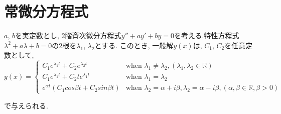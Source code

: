 \section{常微分方程式} %
\label{sec:常微分方程式}
\begin{theo}
    $a$, $b$を実定数とし, 2階斉次微分方程式$y''+ay'+by=0$を考える.特性方程式$\lambda^2+a\lambda+b=0$の2根を$\lambda_{1}$, $\lambda_{2}$とする. このとき, 一般解$y(x)$は, $C_{1}$, $C_{2}$を任意定数として, 
    \begin{equation}
        y(x)= \begin{cases}
                C_{1}e^{\lambda_{1} t}+C_{2}e^{\lambda_{2} t} &\text{when }\lambda_{1}\neq\lambda_{2}, (\lambda_{1}, \lambda_{2}\in\mathbb{R}) \\
                C_{1}e^{\lambda_{1} t}+C_{2}te^{\lambda_{1} t} &\text{when }\lambda_{1}=\lambda_{2} \\
                e^{\alpha t}(C_{1}cos{\beta t}+C_{2}sin{\beta t}) &\text{when }\lambda_{2}=\alpha+{i\beta}, \lambda_{2}=\alpha-{i\beta}, (\alpha, \beta\in\mathbb{R}, \beta>0)
        \end{cases}
    \end{equation}
\end{theo}
で与えられる.
